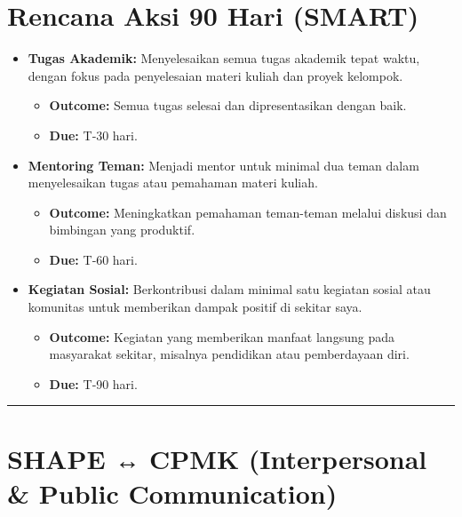 \documentclass[
  letterpaper,
  DIV=11,
  numbers=noendperiod]{scrreprt}
\providecommand{\tightlist}{%
  \setlength{\itemsep}{0pt}\setlength{\parskip}{0pt}}
\begin{document}
\section{Rencana Aksi 90 Hari (SMART)}\label{rencana-aksi-90-hari-smart}

\begin{itemize}
\tightlist
\item
  \textbf{Tugas Akademik:} Menyelesaikan semua tugas akademik tepat
  waktu, dengan fokus pada penyelesaian materi kuliah dan proyek
  kelompok.

  \begin{itemize}
  \tightlist
  \item
    \textbf{Outcome:} Semua tugas selesai dan dipresentasikan dengan
    baik.\\
  \item
    \textbf{Due:} T‑30 hari.
  \end{itemize}
\item
  \textbf{Mentoring Teman:} Menjadi mentor untuk minimal dua teman dalam
  menyelesaikan tugas atau pemahaman materi kuliah.

  \begin{itemize}
  \tightlist
  \item
    \textbf{Outcome:} Meningkatkan pemahaman teman-teman melalui diskusi
    dan bimbingan yang produktif.\\
  \item
    \textbf{Due:} T‑60 hari.
  \end{itemize}
\item
  \textbf{Kegiatan Sosial:} Berkontribusi dalam minimal satu kegiatan
  sosial atau komunitas untuk memberikan dampak positif di sekitar saya.

  \begin{itemize}
  \tightlist
  \item
    \textbf{Outcome:} Kegiatan yang memberikan manfaat langsung pada
    masyarakat sekitar, misalnya pendidikan atau pemberdayaan diri.\\
  \item
    \textbf{Due:} T‑90 hari.
  \end{itemize}
\end{itemize}

\begin{center}\rule{0.5\linewidth}{0.5pt}\end{center}

\section{SHAPE ↔ CPMK (Interpersonal \& Public
Communication)}\label{shape-cpmk-interpersonal-public-communication}
\end{document}
